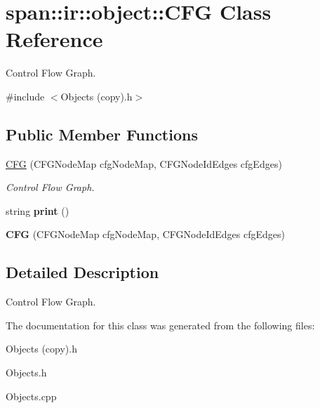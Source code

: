 \hypertarget{classspan_1_1ir_1_1object_1_1CFG}{}\section{span\+:\+:ir\+:\+:object\+:\+:C\+FG Class Reference}
\label{classspan_1_1ir_1_1object_1_1CFG}


Control Flow Graph.  




{\ttfamily \#include $<$Objects (copy).\+h$>$}

\subsection*{Public Member Functions}
\begin{DoxyCompactItemize}
\item 
\mbox{\label{classspan_1_1ir_1_1object_1_1CFG_a7b0e90465052622b350cb2153a4647cf}} 
\hyperlink{classspan_1_1ir_1_1object_1_1CFG_a7b0e90465052622b350cb2153a4647cf}{C\+FG} (C\+F\+G\+Node\+Map cfg\+Node\+Map, C\+F\+G\+Node\+Id\+Edges cfg\+Edges)
\begin{DoxyCompactList}\small\item\em Control Flow Graph. \end{DoxyCompactList}\item 
\mbox{\label{classspan_1_1ir_1_1object_1_1CFG_a8f6cddb4ff927923f144742fa22a4d28}} 
string {\bfseries print} ()
\item 
\mbox{\label{classspan_1_1ir_1_1object_1_1CFG_a99806cb1248fc24aa6a8384152095d42}} 
{\bfseries C\+FG} (C\+F\+G\+Node\+Map cfg\+Node\+Map, C\+F\+G\+Node\+Id\+Edges cfg\+Edges)
\end{DoxyCompactItemize}


\subsection{Detailed Description}
Control Flow Graph. 

The documentation for this class was generated from the following files\+:\begin{DoxyCompactItemize}
\item 
Objects (copy).\+h\item 
Objects.\+h\item 
Objects.\+cpp\end{DoxyCompactItemize}
